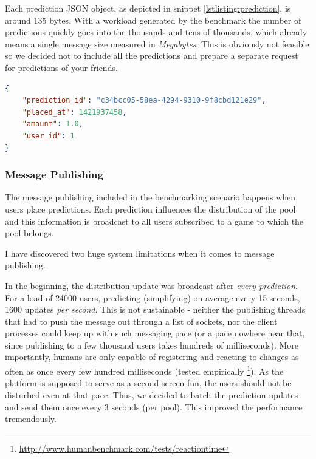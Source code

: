 \documentclass{uvamscse}
\begin{document}
Each prediction JSON object, as depicted in snippet \ref{lstlisting:prediction}, is around 135 bytes. With a workload generated by the benchmark the number of predictions quickly goes into the thousands and tens of thousands, which already means a single message size measured in \textit{Megabytes}. This is obviously not feasible so we decided not to include all the predictions and prepare a separate request for predictions of your friends.

\begin{sourcecode}[H]
\begin{lstlisting}[style=mono,language=json]
{
    "prediction_id": "c34bcc05-58ea-4294-9310-9f8cbd121e29",
    "placed_at": 1421937458,
    "amount": 1.0,
    "user_id": 1
}
\end{lstlisting}
\caption{Single prediction JSON object.}
\label{lstlisting:prediction}
\end{sourcecode}

\subsubsection{Message Publishing}
The message publishing included in the benchmarking scenario happens when users place predictions. Each prediction influences the distribution of the pool and this information is broadcast to all users subscribed to a game to which the pool belongs.

I have discovered two huge system limitations when it comes to message publishing.

In the beginning, the distribution update was broadcast after \textit{every prediction}. For a load of 24000 users, predicting (simplifying) on average every 15 seconds, 1600 updates \textit{per second}. This is not sustainable - neither the publishing threads that had to push the message out through a list of sockets, nor the client processes could keep up with such messaging pace (or a pace nowhere near that, since publishing to a few thousand users takes hundreds of milliseconds). More importantly, humans are only capable of registering and reacting to changes as often as once every few hundred milliseconds (tested empirically \footnote{\url{http://www.humanbenchmark.com/tests/reactiontime}}). As the platform is supposed to serve as a second-screen fun, the users should not be disturbed even at that pace. Thus, we decided to batch the prediction updates and send them once every 3 seconds (per pool). This improved the performance tremendously.
\end{document}
